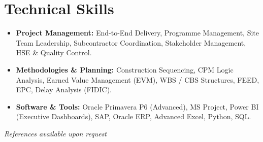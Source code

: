 \documentclass[11pt,a4paper]{article}
\begin{document}
\section{Technical Skills}
\begin{itemize}[label={\color{awesome-blue}\small\textbullet}, leftmargin=*, itemsep=0pt, parsep=0pt]
    \raggedright
    \item \textbf{Project Management:} End-to-End Delivery, Programme Management, Site Team Leadership, Subcontractor Coordination, Stakeholder Management, HSE \& Quality Control.
    \item \textbf{Methodologies \& Planning:} Construction Sequencing, CPM Logic Analysis, Earned Value Management (EVM), WBS / CBS Structures, FEED, EPC, Delay Analysis (FIDIC).
    \item \textbf{Software \& Tools:} Oracle Primavera P6 (Advanced), MS Project, Power BI (Executive Dashboards), SAP, Oracle ERP, Advanced Excel, Python, SQL.
\end{itemize}

\vfill
\begin{center}
    \textit{References available upon request}
\end{center}
\end{document}
